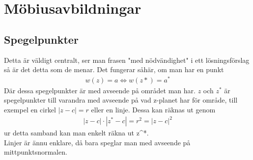 \section{Möbiusavbildningar}

\subsection{Spegelpunkter}
Detta är väldigt centralt, ser man frasen "med nödvändighet" i ett lösningsförslag så är det detta som de menar. Det fungerar såhär, om man har en punkt
\begin{align*}
	w(z) = a \iff w(z*) = a^*
\end{align*}
Där dessa spegelpunkter är med avseende på området man har. $z$ och $z^*$ är spegelpunkter till varandra med avseende på vad z-planet har för område, till exempel en cirkel $|z-c| = r$ eller en linje.  Dessa kan räknas ut genom
\begin{align*}
	|z-c| \cdot |z^*-c| = r^2 = |z-c|^2	
\end{align*}
ur detta  samband kan man enkelt räkna ut z^*. \\

Linjer är ännu enklare, då bara speglar man med avseende på mittpunktsnormalen.
